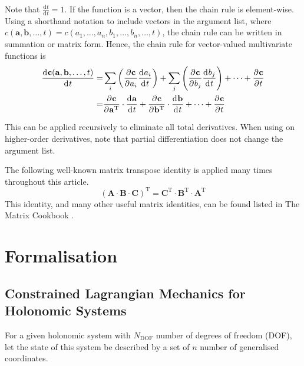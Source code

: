 \documentclass[11pt]{article}
\newcommand{\oD}[2]{
    \frac{\mathrm{d}\mspace{1mu}#1}{\mathrm{d}\mspace{1mu}#2}
}
\newcommand{\pD}[2]{
    \frac{\partial\mspace{1mu}#1}{\partial\mspace{1mu}#2}
}
\begin{document}
Note that $\oD{t}{t}=1$. If the function is a vector, then the chain rule is element-wise. Using a shorthand notation to include vectors in the argument list, where $c(\mathbf{a},\mathbf{b},\dots,t)=c(a_1,\dots,a_n,b_1,\dots,b_n,\dots,t)$, the chain rule can be written in summation or matrix form. Hence, the chain rule for vector-valued multivariate functions is
\begin{align} \label{eq:n:chain-rule}
    \oD{\mathbf{c}(\mathbf{a},\mathbf{b},\dots,t)}{t}
    =& \sum_{i} \del{\pD{\mathbf{c}}{a_i}\oD{a_i}{t}} + \sum_{j} \del{\pD{\mathbf{c}}{b_j}\oD{b_j}{t}} + \dots + \pD{\mathbf{c}}{t} \nonumber\\
    =& \pD{\mathbf{c}}{\mathbf{a}^{\mathrm{T}}}\cdot\oD{\mathbf{a}}{t} + \pD{\mathbf{c}}{\mathbf{b}^{\mathrm{T}}}\cdot\oD{\mathbf{b}}{t} + \dots + \pD{\mathbf{c}}{t}
\end{align}

This can be applied recursively to eliminate all total derivatives. When using on higher-order derivatives, note that partial differentiation does not change the argument list.

The following well-known matrix transpose identity is applied many times throughout this article.
\begin{equation} \label{eq:n:transpose-identity}
    (\mathbf{A}\cdot\mathbf{B}\cdot\mathbf{C})^\mathrm{T} = \mathbf{C}^\mathrm{T}\cdot\mathbf{B}^\mathrm{T}\cdot\mathbf{A}^\mathrm{T}
\end{equation}
This identity, and many other useful matrix identities, can be found listed in The Matrix Cookbook \cite{RF1-32}.


\section{Formalisation} \label{sec:f}

\subsection{Constrained Lagrangian Mechanics for Holonomic Systems} \label{ssec:f:constrained}
For a given holonomic system with $N_{\mathrm{DOF}}$ number of degrees of freedom (DOF), let the state of this system be described by a set of $n$ number of generalised coordinates.
\end{document}
